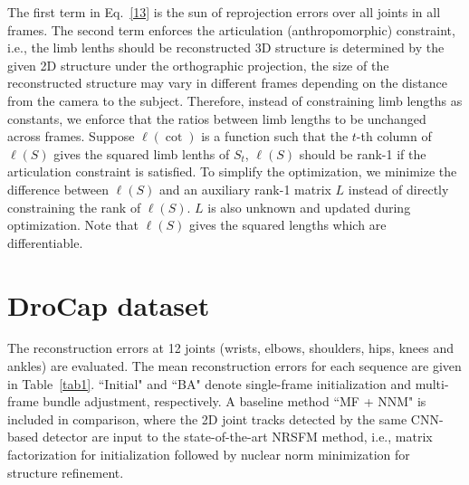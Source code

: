 \documentclass[10pt,twocolumn,letterpaper]{article}
\begin{document}
\par
The first term in Eq.~\ref{13} is the sun of reprojection errors over all joints in all frames. The second term enforces the articulation (anthropomorphic) constraint, i.e., the limb lenths should be reconstructed 3D structure is determined by the given 2D structure under the orthographic projection, the size of the reconstructed structure may vary in different frames depending on the distance from the camera to the subject. Therefore, instead of constraining limb lengths as constants, we enforce that the ratios between limb lengths to be unchanged across frames. Suppose $\ell(\cot)$ is a function such that the $t$-th column of $\ell(S)$ gives the squared limb lenths of $S_t$, $\ell(S)$ should be rank-1 if the articulation constraint is satisfied. To simplify the optimization, we minimize the difference between $\ell(S)$ and an auxiliary rank-1 matrix $L$ instead of directly constraining the rank of $\ell(S)$. $L$  is also unknown and updated during optimization. Note that $\ell(S)$ gives the squared lengths which are differentiable. 
\section{DroCap dataset}
The reconstruction errors at 12 joints (wrists, elbows, shoulders, hips, knees and ankles) are evaluated. The mean reconstruction errors for each sequence are given in Table~\ref{tab1}. ``Initial" and ``BA" denote single-frame initialization and multi-frame bundle adjustment, respectively. A baseline method ``MF + NNM" is included in comparison, where the
2D joint tracks detected by the same CNN-based detector are input to the state-of-the-art NRSFM method, i.e., matrix factorization for initialization followed by nuclear norm minimization for structure refinement.
{\small


}
\end{document}
